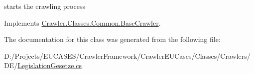 starts the crawling process 



Implements \hyperlink{class_crawler_1_1_classes_1_1_common_1_1_base_crawler_a14b2a286ce7fb2899bd915dd345bf6b7}{Crawler.\-Classes.\-Common.\-Base\-Crawler}.



The documentation for this class was generated from the following file\-:\begin{DoxyCompactItemize}
\item 
D\-:/\-Projects/\-E\-U\-C\-A\-S\-E\-S/\-Crawler\-Framework/\-Crawler\-E\-U\-Cases/\-Classes/\-Crawlers/\-D\-E/\hyperlink{_legislation_gesetze_8cs}{Legislation\-Gesetze.\-cs}\end{DoxyCompactItemize}
